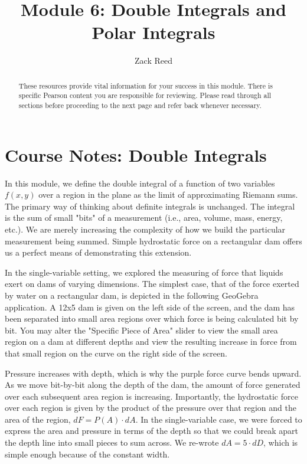 \documentclass{ximera}
\title{Module 6: Double Integrals and Polar Integrals}
\author{Zack Reed}
\begin{document}
\begin{abstract}
These resources provide vital information for your success in this module. There is specific Pearson content you are responsible for reviewing. Please read through all sections before proceeding to the next page and refer back whenever necessary.
\end{abstract}
\maketitle

\section{Course Notes: Double Integrals}

In this module, we define the double integral of a function of two variables $f(x,y)$ over a region in the plane as the limit of approximating Riemann sums. The primary way of thinking about definite integrals is unchanged. The integral is the sum of small "bits" of a measurement (i.e., area, volume, mass, energy, etc.). We are merely increasing the complexity of how we build the particular measurement being summed. Simple hydrostatic force on a rectangular dam offers us a perfect means of demonstrating this extension.

In the single-variable setting, we explored the measuring of force that liquids exert on dams of varying dimensions. The simplest case, that of the force exerted by water on a rectangular dam, is depicted in the following GeoGebra application. A 12x5 dam is given on the left side of the screen, and the dam has been separated into small area regions over which force is being calculated bit by bit. You may alter the "Specific Piece of Area" slider to view the small area region on a dam at different depths and view the resulting increase in force from that small region on the curve on the right side of the screen.

\begin{center}
\end{center}

Pressure increases with depth, which is why the purple force curve bends upward. As we move bit-by-bit along the depth of the dam, the amount of force generated over each subsequent area region is increasing. Importantly, the hydrostatic force over each region is given by the product of the pressure over that region and the area of the region, $dF=P(A)\cdot dA$. In the single-variable case, we were forced to express the area and pressure in terms of the depth so that we could break apart the depth line into small pieces to sum across. We re-wrote $dA=5\cdot dD$, which is simple enough because of the constant width.
\end{document}

